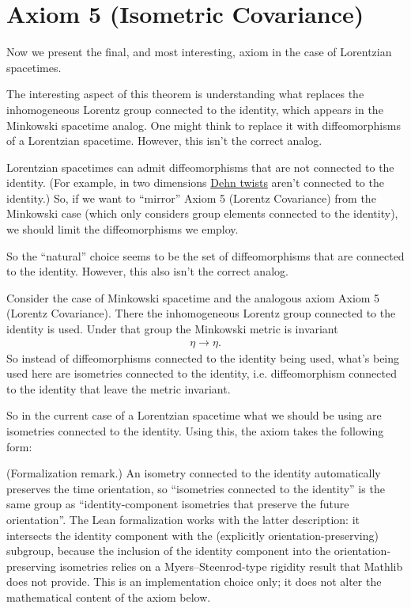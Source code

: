 \section{Axiom 5 (Isometric Covariance)}\label{sctn:axiom-5-(isometric-covariance)}
Now we present the final, and most interesting, axiom in the case of Lorentzian spacetimes.

The interesting aspect of this theorem is understanding what replaces the inhomogeneous Lorentz group connected to the identity, which appears in the Minkowski spacetime analog. One might think to replace it with diffeomorphisms of a Lorentzian spacetime. However, this isn't the correct analog.

Lorentzian spacetimes can admit diffeomorphisms that are not connected to the identity. (For example, in two dimensions \href{https://en.wikipedia.org/wiki/Dehn_twist}{Dehn twists} aren't connected to the identity.) So, if we want to ``mirror'' Axiom 5 (Lorentz Covariance) from the Minkowski case (which only considers group elements connected to the identity), we should limit the diffeomorphisms we employ.

So the ``natural'' choice seems to be the set of diffeomorphisms that are connected to the identity. However, this also isn't the correct analog.

Consider the case of Minkowski spacetime and the analogous axiom Axiom 5 (Lorentz Covariance). There the inhomogeneous Lorentz group connected to the identity is used. Under that group the Minkowski metric is invariant
\begin{align}
    \eta \longrightarrow \eta.
\end{align}
So instead of diffeomorphisms connected to the identity being used, what's being used here are isometries connected to the identity, i.e. diffeomorphism connected to the identity that leave the metric invariant.

So in the current case of a Lorentzian spacetime what we should be using are isometries connected to the identity. Using this, the axiom takes the following form:

(Formalization remark.) An isometry connected to the identity automatically preserves the time orientation, so ``isometries connected to the identity'' is the same group as ``identity-component isometries that preserve the future orientation''. The Lean formalization works with the latter description: it intersects the identity component with the (explicitly orientation-preserving) subgroup, because the inclusion of the identity component into the orientation-preserving isometries relies on a Myers--Steenrod-type rigidity result that Mathlib does not provide. This is an implementation choice only; it does not alter the mathematical content of the axiom below.

